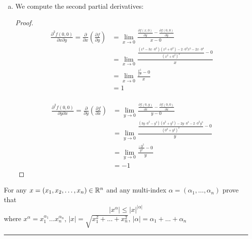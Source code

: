\documentclass[11pt]{article}
\begin{document}
\begin{enumerate}[(a)]
    
    \item We compute the second partial derivatives:
    \begin{proof}
        
        \begin{align*}
            \frac{\partial ^2 f(0,0)}{\partial x \partial y} = \frac{\partial}{\partial x} \left( \frac{\partial f}{\partial y} \right) &= 
                \lim_{x \to 0} \frac{\frac{\partial f(x,0)}{\partial y} - \frac{\partial f(0,0)}{\partial y}}{x - 0}\\
            &= \lim_{x \to 0} \frac{\frac{(x^3 - 3x \cdot 0^2)(x^2 + 0^2) - 2 \cdot 0^2x^3-2x \cdot 0^4}{(x^2 + 0^2)^2} - 0}{x} \\
            &= \lim_{x \to 0} \frac{\frac{x^5}{x^4} - 0}{x} \\
            &= 1\\
        \end{align*}

        \begin{align*}
            \frac{\partial ^2 f(0,0)}{\partial y \partial x} = \frac{\partial}{\partial y} \left( \frac{\partial f}{\partial x} \right) &= 
                \lim_{y \to 0} \frac{\frac{\partial f(0,y)}{\partial x} - \frac{\partial f(0,0)}{\partial x}}{y - 0}\\
            &= \lim_{y \to 0} \frac{\frac{(3y \cdot 0^2 - y^3)(0^2 + y^2) - 2y \cdot 0^4-2 \cdot 0^2y^3}{(0^2 + y^2)^2} - 0}{y}\\
            &= \lim_{y \to 0} \frac{\frac{- y^5}{y^4} - 0}{y}\\
            &= -1
        \end{align*}

    \end{proof}
\end{enumerate}





For any $x = (x_1, x_2, \dots, x_n) \in \mathbb{R} ^n$ and any multi-index $\alpha = (\alpha_1, \dots, \alpha_n)$ prove that 
$$|x^\alpha| \leq |x|^{|\alpha|}$$
where $x^\alpha = x_1^{\alpha_1} \dots x_n^{\alpha_n}$, $|x| = \sqrt{x_1^2 + \dots + x_n^2}$, $|\alpha| = \alpha_1 + \dots + \alpha_n$

\hrule
\end{document}
